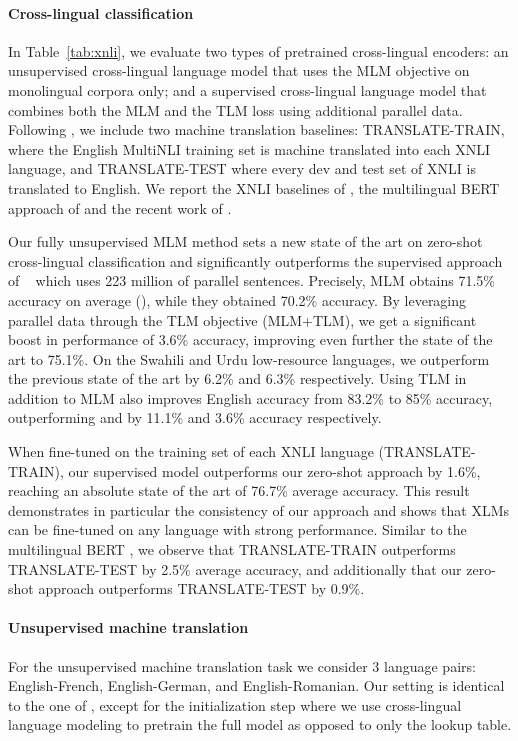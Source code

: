 \documentclass[11pt,a4paper]{article}
\begin{document}
\paragraph{Cross-lingual classification}
In Table~\ref{tab:xnli}, we evaluate two types of pretrained cross-lingual encoders: an unsupervised cross-lingual language model that uses the MLM objective on monolingual corpora only; and a supervised cross-lingual language model that combines both the MLM and the TLM loss using additional parallel data. Following \citet{conneau2018xnli}, we include two machine translation baselines: TRANSLATE-TRAIN, where the English MultiNLI training set is machine translated into each XNLI language, and TRANSLATE-TEST where every dev and test set of XNLI is translated to English. We report the XNLI baselines of \citet{conneau2018xnli}, the multilingual BERT approach of \citet{devlin2018bert} and the recent work of \citet{artetxe2018massively}.

Our fully unsupervised MLM method sets a new state of the art on zero-shot cross-lingual classification and significantly outperforms the supervised approach of ~\citet{artetxe2018massively} which uses 223 million of parallel sentences. Precisely, MLM obtains 71.5\% accuracy on average (), while they obtained 70.2\% accuracy. By leveraging parallel data through the TLM objective (MLM+TLM), we get a significant boost in performance of 3.6\% accuracy, improving even further the state of the art to 75.1\%. On the Swahili and Urdu low-resource languages, we outperform the previous state of the art by 6.2\% and 6.3\% respectively. Using TLM in addition to MLM also improves English accuracy from 83.2\% to 85\% accuracy, outperforming \citet{artetxe2018massively} and \citet{devlin2018bert} by 11.1\% and 3.6\% accuracy respectively.

When fine-tuned on the training set of each XNLI language (TRANSLATE-TRAIN), our supervised model outperforms our zero-shot approach by 1.6\%, reaching an absolute state of the art of 76.7\% average accuracy. This result demonstrates in particular the consistency of our approach and shows that XLMs can be fine-tuned on any language with strong performance. Similar to the multilingual BERT \cite{devlin2018bert}, we observe that TRANSLATE-TRAIN outperforms TRANSLATE-TEST by 2.5\% average accuracy, and additionally that our zero-shot approach outperforms TRANSLATE-TEST by 0.9\%.


\paragraph{Unsupervised machine translation}
For the unsupervised machine translation task we consider 3 language pairs: English-French, English-German, and English-Romanian. Our setting is identical to the one of \citet{lample2018phrase}, except for the initialization step where we use cross-lingual language modeling to pretrain the full model as opposed to only the lookup table.
\end{document}

